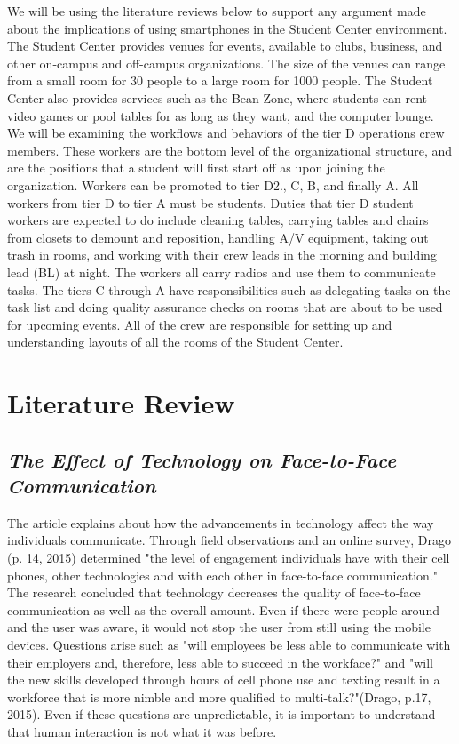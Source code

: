 \documentclass[letterpaper, 12pt]{report}
\begin{document}
	We will be using the literature reviews below to support any argument made about the implications of using smartphones in the Student Center environment.\\
	
	The Student Center provides venues for events, available to clubs, business, and other on-campus and off-campus organizations. The size of the venues can range from a small room for 30 people to a large room for 1000 people. The Student Center also provides services such as the Bean Zone, where students can rent video games or pool tables for as long as they want, and the computer lounge.\\
	
	We will be examining the workflows and behaviors of the tier D operations crew members. These workers are the bottom level of the organizational structure, and are the positions that a student will first start off as upon joining the organization. Workers can be promoted to tier D2., C, B, and finally A. All workers from tier D to tier A must be students. Duties that tier D student workers are expected to do include cleaning tables, carrying tables and chairs from closets to demount and reposition, handling A/V equipment, taking out trash in rooms, and working with their crew leads in the morning and building lead (BL) at night. The workers all carry radios and use them to communicate tasks. The tiers C through A have responsibilities such as delegating tasks on the task list and doing quality assurance checks on rooms that are about to be used for upcoming events. All of the crew are responsible for setting up and understanding layouts of all the rooms of the Student Center.\\

	\section{Literature Review}
	\subsection{\textit{The Effect of Technology on Face-to-Face Communication}}
	The article explains about how the advancements in technology affect the way individuals communicate. Through field observations and an online survey, Drago (p. 14, 2015) determined "the level of engagement individuals have with their cell phones, other technologies and with each other in face-to-face communication." The research concluded that technology decreases the quality of face-to-face communication as well as the overall amount. Even if there were people around and the user was aware, it would not stop the user from still using the mobile devices. Questions arise such as "will employees be less able to communicate with their employers and, therefore, less able to succeed in the workface?" and "will the new skills developed through hours of cell phone use and texting result in a workforce that is more nimble and more qualified to multi-talk?"(Drago, p.17, 2015). Even if these questions are unpredictable, it is important to understand that human interaction is not what it was before.\\
	
\end{document}
